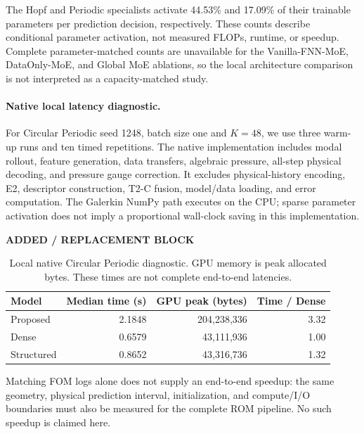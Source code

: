 \documentclass{article}
\providecommand{\DIFaddtex}[1]{{\protect\color{blue} \sf #1}} %
\providecommand{\DIFaddbegin}{} %
\providecommand{\DIFadd}[1]{\texorpdfstring{\DIFaddtex{#1}}{#1}} %
\begin{document}
\par

The Hopf and Periodic specialists activate 44.53\% and 17.09\% of their
trainable parameters per prediction decision, respectively. These counts
describe conditional parameter activation, not measured FLOPs, runtime,
or speedup. Complete parameter-matched counts are unavailable for the
Vanilla-FNN-MoE, DataOnly-MoE, and Global MoE ablations, so the local
architecture comparison is not interpreted as a capacity-matched study.
\DIFaddbegin 

\paragraph{\DIFadd{Native local latency diagnostic.}}
\DIFadd{For Circular Periodic seed 1248, batch size one and $K=48$, we use three
warm-up runs and ten timed repetitions. The native implementation
includes modal rollout, feature generation, data transfers, algebraic
pressure, all-step physical decoding, and pressure gauge correction.
It excludes physical-history encoding, E2, descriptor construction,
T2-C fusion, model/data loading, and error computation. The Galerkin
NumPy path executes on the CPU; sparse parameter activation does not
imply a proportional wall-clock saving in this implementation.
}




{\color{blue}
\begin{table}[H]
\color{blue}\noindent\textbf{ADDED / REPLACEMENT BLOCK}\par
\centering
\caption{Local native Circular Periodic diagnostic. GPU memory is peak
allocated bytes. These times are not complete end-to-end latencies.}
\label{tab:local_latency}
\small
\begin{tabular}{@{}lrrr@{}}
\toprule
Model & Median time (s) & GPU peak (bytes) & Time / Dense\\
\midrule
Proposed & 2.1848 & 204,238,336 & 3.32\\
Dense & 0.6579 & 43,111,936 & 1.00\\
Structured & 0.8652 & 43,316,736 & 1.32\\
\bottomrule
\end{tabular}
\end{table}
}




\DIFadd{Matching FOM logs alone does not supply an end-to-end speedup: the same
geometry, physical prediction interval, initialization, and compute/I/O
boundaries must also be measured for the complete ROM pipeline. No such
speedup is claimed here.
}
\end{document}
